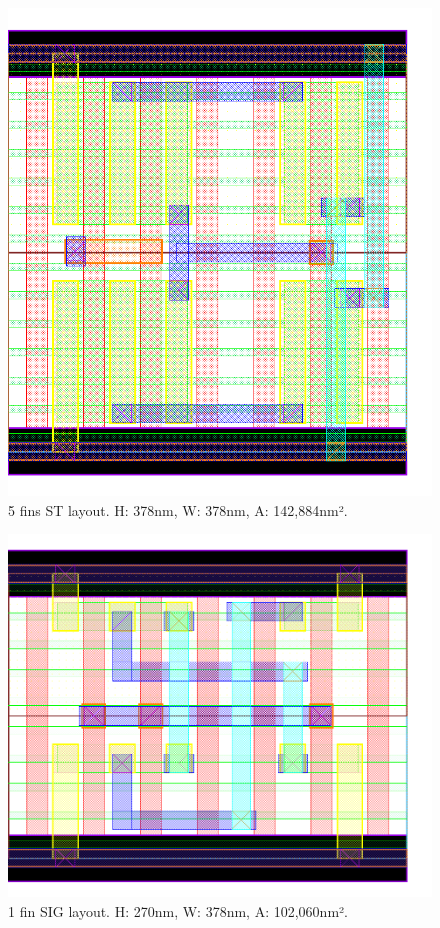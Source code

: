 \documentclass[diss,pgmicro,english]{iiufrgs}
\begin{document}
\begin{figure}[]
\centering
\includegraphics[width=\textwidth,height=\textheight,keepaspectratio]{ST5F.png}
\caption{5 fins ST layout. H: 378nm, W: 378nm, A: 142,884nm².}
\label{fig:ST5F}
\end{figure}






\begin{figure}[]
\centering
\includegraphics[width=\textwidth,height=\textheight,keepaspectratio]{SIG1F.png}
\caption{1 fin SIG layout. H: 270nm, W: 378nm, A: 102,060nm².}
\label{fig:SIG1F}
\end{figure}
\end{document}
